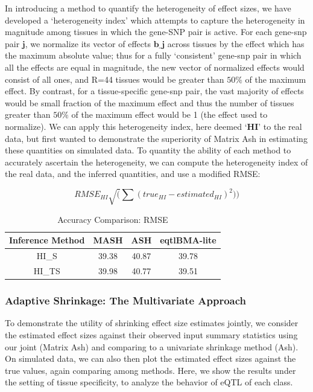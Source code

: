 In introducing a method to quantify the heterogeneity of effect sizes, we have developed a `heterogeneity index' which attempts to capture the heterogeneity in magnitude among tissues in which the gene-SNP pair is active. For each gene-snp pair $\textbf{j}$, we normalize its vector of effects $\textbf{b_{j}}$ across tissues by the effect which has the maximum absolute value; thus for a fully `consistent' gene-snp pair in which all the effects are equal in magnitude, the new vector of normalized effects would consist of all ones, and R=44 tissues would be greater than $50\%$ of the maximum effect. By contrast, for a tissue-specific gene-snp pair, the vast majority of effects would be small fraction of the maximum effect and thus the number of tissues greater than $50\%$ of the maximum effect would be 1 (the effect used to normalize). We can apply this heterogeneity index, here deemed $\textbf{`HI'}$ to the real data, but first wanted to demonstrate the superiority of Matrix Ash in estimating these quantities on simulated data. To quantity the ability of each method to accurately ascertain the heterogeneity, we can compute the heterogeneity index of the real data, and the inferred quantities, and use a modified RMSE:

\begin{equation}
RMSE_{HI} \sqrt(\sum(true_{HI}-estimated_{HI})^2))
\end{equation}

\begin{table}[ht]
\caption{Accuracy Comparison: RMSE}
\centering
\begin{tabular}{c c c c}
\hline\hline
Inference Method & MASH & ASH & eqtlBMA-lite \\ [0.5ex] %
\hline
HI_{S}&39.38 &40.87 &39.78 \\
HI_{TS}& 39.98& 40.77&39.51\\
\hline
\end{tabular}
\label{table:HETindex}
\end{table}

\subsubsection{Adaptive Shrinkage: The Multivariate Approach}

To demonstrate the utility of shrinking effect size estimates jointly, we consider the estimated effect sizes against their observed input summary statistics using our joint (Matrix Ash) and comparing to a univariate shrinkage method (Ash). On simulated data, we can also then plot the estimated effect sizes against the true values,  again comparing among methods. Here, we show the results under the setting of tissue specificity, to analyze the behavior of eQTL of each class.\newline

